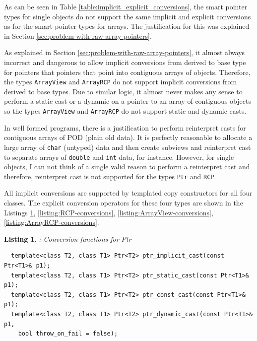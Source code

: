 \documentclass[pdf,ps2pdf,11pt]{SANDreport}
\newtheorem{listing}{Listing}
\begin{document}
As can be seen in Table {}\ref{table:implicit_explicit_conversions},
the smart pointer types for single objects do not support the same
implicit and explicit conversions as for the smart pointer types for
arrays.  The justification for this was explained in Section
{}\ref{sec:problem-with-raw-array-pointers}.

As explained in Section {}\ref{sec:problem-with-raw-array-pointers},
it almost always incorrect and dangerous to allow implicit conversions
from derived to base type for pointers that pointers that point into
contiguous arrays of objects.  Therefore, the types
{}\texttt{ArrayView} and {}\texttt{ArrayRCP} do not support implicit
conversions from derived to base types.  Due to similar logic, it
almost never makes any sense to perform a static cast or a dynamic on
a pointer to an array of contiguous objects so the types
{}\texttt{ArrayView} and {}\texttt{ArrayRCP} do not support static and
dynamic casts.

In well formed programs, there is a justification to perform
reinterpret casts for contiguous arrays of POD (plain old data). It is
perfectly reasonable to allocate a large array of {}\texttt{char}
(untyped) data and then create subviews and reinterpret cast to
separate arrays of {}\texttt{double} and {}\texttt{int} data, for
instance.  However, for single objects, I can not think of a single
valid reason to perform a reinterpret cast and therefore, reinterpret
cast is not supported for the types {}\texttt{Ptr} and {}\texttt{RCP}.

All implicit conversions are supported by templated copy constructors
for all four classes.  The explicit conversion operators for these
four types are shown in the Listings {}\ref{listing:Ptr-conversions},
{}\ref{listing:RCP-conversions},
{}\ref{listing:ArrayView-conversions},
{}\ref{listing:ArrayRCP-conversions}.

\begin{listing}: Conversion functions for Ptr\\
\label{listing:Ptr-conversions}
{\small\begin{verbatim}
  template<class T2, class T1> Ptr<T2> ptr_implicit_cast(const Ptr<T1>& p1);
  template<class T2, class T1> Ptr<T2> ptr_static_cast(const Ptr<T1>& p1);
  template<class T2, class T1> Ptr<T2> ptr_const_cast(const Ptr<T1>& p1);
  template<class T2, class T1> Ptr<T2> ptr_dynamic_cast(const Ptr<T1>& p1,
    bool throw_on_fail = false);
\end{verbatim}}
\end{listing}
\end{document}
